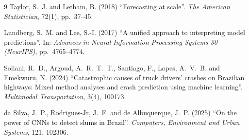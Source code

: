 \documentclass[12pt]{article}
\begin{document}
\begin{thebibliography}{9}
 Taylor, S.~J. and Letham, B. (2018) ``Forecasting at
scale''. \emph{The American Statistician}, 72(1), pp.~37--45.

 Lundberg, S.~M. and Lee, S.-I. (2017) ``A unified
approach to interpreting model predictions''. In: \emph{Advances in Neural
Information Processing Systems 30 (NeurIPS)}, pp.~4765--4774.

 Soliani, R.~D., Argoud, A.~R.~T.~T., Santiago, F.,
Lopes, A.~V.~B. and Emekwuru, N. (2024) ``Catastrophic causes of truck
drivers' crashes on Brazilian highways: Mixed method analyses and crash
prediction using machine learning''. \emph{Multimodal Transportation},
3(4), 100173.

 da Silva, J.~P., Rodrigues-Jr, J.~F. and de
Albuquerque, J.~P. (2025) ``On the power of CNNs to detect slums in
Brazil''. \emph{Computers, Environment and Urban Systems}, 121, 102306.

\end{thebibliography}
\end{document}

